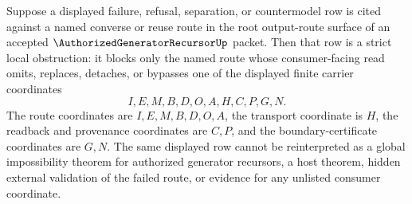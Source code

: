 \begin{corollary}
\label{cor:authorized-generator-recursor-root-output-route-strict-obstruction}
Suppose a displayed failure, refusal, separation, or countermodel row is cited against a named converse or reuse route in the root output-route surface of an accepted $\AuthorizedGeneratorRecursorUp$ packet. Then that row is a strict local obstruction: it blocks only the named route whose consumer-facing read omits, replaces, detaches, or bypasses one of the displayed finite carrier coordinates
$$
I,E,M,B,D,O,A,H,C,P,G,N.
$$
The route coordinates are $I,E,M,B,D,O,A$, the transport coordinate is $H$, the readback and provenance coordinates are $C,P$, and the boundary-certificate coordinates are $G,N$. The same displayed row cannot be reinterpreted as a global impossibility theorem for authorized generator recursors, a host theorem, hidden external validation of the failed route, or evidence for any unlisted consumer coordinate.
\end{corollary}
